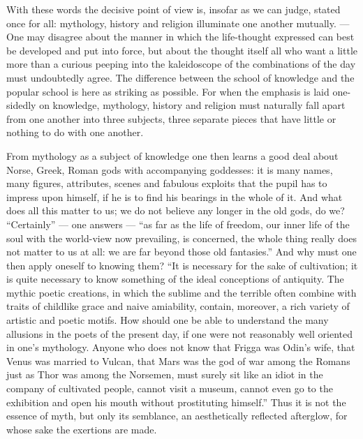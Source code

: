 \documentclass[12pt,a4paper,openany]{book}
\newcommand{\opage}[1]{\marginnote{\footnotesize\textit{[#1]}}}
\begin{document}
With these words the decisive point of view is, insofar
\setcounter{footnote}{0}%
\opage{424}as we can judge, stated once for all: mythology,
history and religion illuminate one another mutually.
--- One may disagree about the manner in which the
life-thought expressed can best be developed and put into
force, but about the thought itself all who want a little
more than a curious peeping into the kaleidoscope of the
combinations of the day must undoubtedly agree. The difference between
the school of knowledge and the popular school is here as striking
as possible. For when the emphasis is laid one-sidedly on
knowledge, mythology, history and religion must naturally
fall apart from one another into three subjects, three separate pieces
that have little or nothing to do with one another.

From mythology as a subject of knowledge one then learns a
good deal about Norse, Greek, Roman gods with accompanying
goddesses: it is many names, many figures,
attributes, scenes and fabulous exploits that the pupil has
to impress upon himself, if he is to find his bearings in the whole of it.
And what does all this matter to us; we do not
believe any longer in the old gods, do we? ``Certainly'' --- one
answers --- ``as far as the life of freedom, our inner life of the soul
with the world-view now prevailing, is concerned, the
whole thing really does not matter to us at all: we are far
beyond those old fantasies.'' And why must one
then apply oneself to knowing them? ``It is necessary
for the sake of cultivation; it is quite necessary to know
something of the ideal conceptions of antiquity. The mythic
poetic creations, in which the sublime and the terrible often
combine with traits of childlike grace and naive amiability,
contain, moreover, a rich variety of
artistic and poetic motifs. How should one
be able to understand the many allusions in the poets of the present day,
\setcounter{footnote}{0}%
\opage{425}if one were not reasonably well oriented in one's mythology.
Anyone who does not know that Frigga was Odin's wife,
that Venus was married to Vulcan, that Mars was the god of war
among the Romans just as Thor was among the Norsemen, must surely
sit like an idiot in the company of cultivated people, cannot
visit a museum, cannot even go to the exhibition
and open his mouth without prostituting himself.''
Thus it is not the essence of myth, but only its semblance,
an aesthetically reflected afterglow, for whose sake the exertions
are made.
\end{document}
